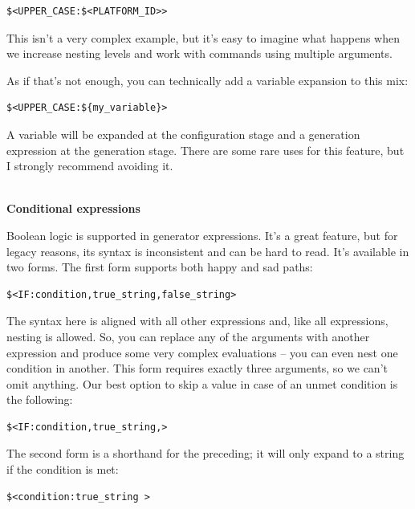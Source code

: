 \begin{lstlisting}[style=styleCMake]
$<UPPER_CASE:$<PLATFORM_ID>>
\end{lstlisting}

This isn't a very complex example, but it's easy to imagine what happens when we increase nesting levels and work with commands using multiple arguments.

As if that's not enough, you can technically add a variable expansion to this mix:

\begin{lstlisting}[style=styleCMake]
$<UPPER_CASE:${my_variable}>
\end{lstlisting}

A variable will be expanded at the configuration stage and a generation expression at the generation stage. There are some rare uses for this feature, but I strongly recommend avoiding it.

\hspace*{\fill} \\ %
\noindent
\textbf{Conditional expressions}

Boolean logic is supported in generator expressions. It's a great feature, but for legacy reasons, its syntax is inconsistent and can be hard to read. It's available in two forms. The first form supports both happy and sad paths:

\begin{lstlisting}[style=styleCMake]
$<IF:condition,true_string,false_string>
\end{lstlisting}

The syntax here is aligned with all other expressions and, like all expressions, nesting is allowed. So, you can replace any of the arguments with another expression and produce some very complex evaluations – you can even nest one condition in another. This form requires exactly three arguments, so we can't omit anything. Our best option to skip a value in case of an unmet condition is the following:

\begin{lstlisting}[style=styleCMake]
$<IF:condition,true_string,>
\end{lstlisting}

The second form is a shorthand for the preceding; it will only expand to a string if the condition is met:

\begin{lstlisting}[style=styleCMake]
$<condition:true_string >
\end{lstlisting}

